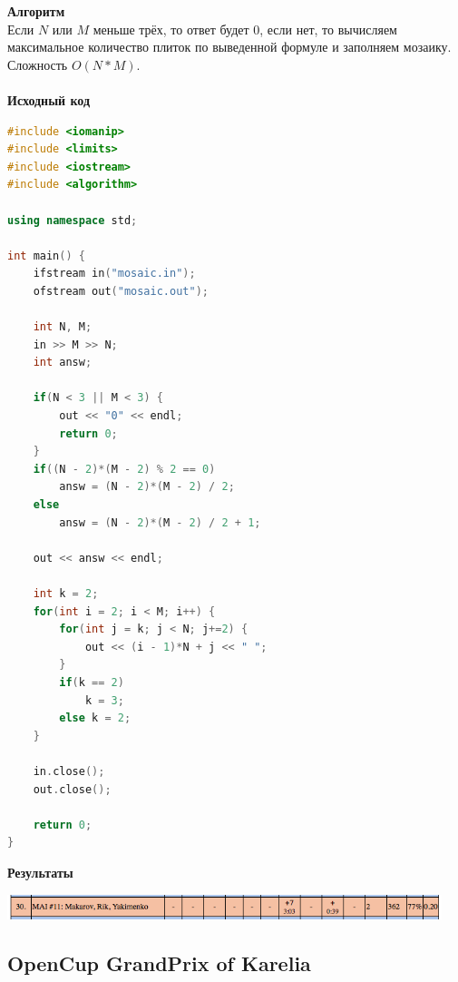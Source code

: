 \documentclass[a4paper,12pt]{article}
\begin{document}
\textbf{{\large Алгоритм}} \\
Если $N$ или $M$ меньше трёх, то ответ будет $0$, если нет, то вычисляем максимальное количество плиток по выведенной формуле и заполняем мозаику. Сложность $O(N*M)$. \\ 
\\
\textbf{{\large Исходный код}}
\begin{lstlisting}[language=C++]
#include <iomanip>
#include <limits>
#include <iostream>
#include <algorithm>

using namespace std;

int main() {
    ifstream in("mosaic.in");
    ofstream out("mosaic.out");

	int N, M;
	in >> M >> N;
	int answ;

	if(N < 3 || M < 3) {
		out << "0" << endl;
		return 0;
	}
	if((N - 2)*(M - 2) % 2 == 0)
		answ = (N - 2)*(M - 2) / 2;
	else
		answ = (N - 2)*(M - 2) / 2 + 1;

	out << answ << endl;

	int k = 2;
	for(int i = 2; i < M; i++) {
		for(int j = k; j < N; j+=2) {
			out << (i - 1)*N + j << " ";
		}
		if(k == 2)
			k = 3;
		else k = 2;
	}

    in.close();
    out.close();

    return 0;
}
\end{lstlisting}

\textbf{{\large Результаты}} \\
\begin{center}
\includegraphics[width=0.95\textwidth]{OC_Northern/OC_Northern_result.png}\\ [1cm]
\end{center}



%
%
\newpage
\subsection{OpenCup GrandPrix of Karelia}
\end{document}
